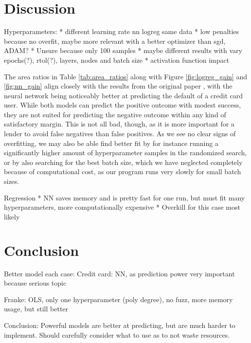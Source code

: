 \documentclass[a4paper, 11pt, twocolumn]{article}
\begin{document}
\section{Discussion}
Hyperparameters:
* different learning rate nn logreg same data
* low penalties because no overfit, maybe more relevant with a better optimizer
than sgd, ADAM?
* Unsure because only 100 samples
* maybe different results with vary epochs(?), rtol(?), layers, nodes and batch size
* activation function impact

The area ratios in Table \ref{tab:area_ratios} along with Figure
\ref{fig:logreg_gain} and \ref{fig:nn_gain} align closely
with the results from the original paper \cite{origarticle}, with the neural
network being noticeably better at predicting the default of a credit card user.
While both models can predict the positive outcome with modest success, they are
not suited for predicting the negative outcome within any kind of satisfactory
margin. This is not all bad, though, as it is more important for a lender to avoid
false negatives than false positives. As we see no clear signs of overfitting,
we may also be able find better fit by for instance running a significantly higher
amount of hyperparameter samples in the randomized search, or by also searching
for the best batch size, which we have neglected completely because of computational
cost, as our program runs very slowly for small batch sizes.

Regression
* NN saves memory and is pretty fast for one run, but must fit many
hyperparameters, more computationally expensive
* Overkill for this case most likely

\section{Conclusion}
Better model each case:
Credit card:
NN, as prediction power very important because serious topic

Franke:
OLS, only one hyperparameter (poly degree), no fuzz, more memory usage, but still better

Conclusion:
Powerful models are better at predicting, but are much harder to implement.
Should carefully consider what to use as to not waste resources.
%

\end{document}
